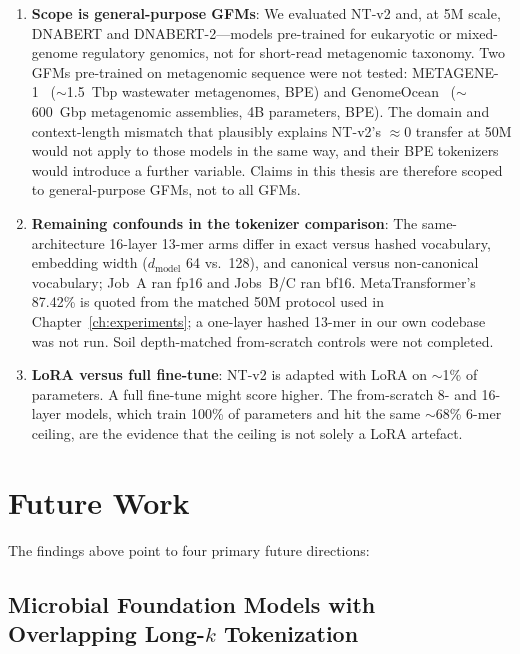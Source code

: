 \begin{enumerate}
    \item \textbf{Scope is general-purpose GFMs}: We evaluated NT-v2 and, at 5M scale, DNABERT and DNABERT-2---models pre-trained for eukaryotic or mixed-genome regulatory genomics, not for short-read metagenomic taxonomy. Two GFMs pre-trained on metagenomic sequence were not tested: METAGENE-1~\cite{Liu2025metagene} ($\sim$1.5~Tbp wastewater metagenomes, BPE) and GenomeOcean~\cite{Zhou2025genomeocean} ($\sim$600~Gbp metagenomic assemblies, 4B parameters, BPE). The domain and context-length mismatch that plausibly explains NT-v2's $\approx 0$ transfer at 50M would not apply to those models in the same way, and their BPE tokenizers would introduce a further variable. Claims in this thesis are therefore scoped to general-purpose GFMs, not to all GFMs.

    \item \textbf{Remaining confounds in the tokenizer comparison}: The same-architecture 16-layer 13-mer arms differ in exact versus hashed vocabulary, embedding width ($d_{\text{model}}$ 64 vs.\ 128), and canonical versus non-canonical vocabulary; Job~A ran fp16 and Jobs~B/C ran bf16. MetaTransformer's 87.42\% is quoted from the matched 50M protocol used in Chapter~\ref{ch:experiments}; a one-layer hashed 13-mer in our own codebase was not run. Soil depth-matched from-scratch controls were not completed.

    \item \textbf{LoRA versus full fine-tune}: NT-v2 is adapted with LoRA on $\sim$1\% of parameters. A full fine-tune might score higher. The from-scratch 8- and 16-layer models, which train 100\% of parameters and hit the same $\sim$68\% 6-mer ceiling, are the evidence that the ceiling is not solely a LoRA artefact.
\end{enumerate}

\section{Future Work}

The findings above point to four primary future directions:

\subsection{Microbial Foundation Models with Overlapping Long-$k$ Tokenization}

